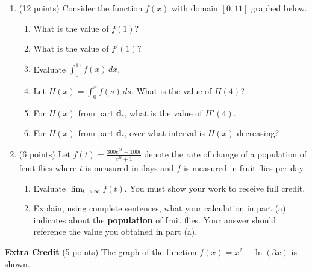 \documentclass[12pt]{article}
\let\ds\displaystyle
\begin{document}
\begin{enumerate}
\newpage
\item (12 points) Consider the function $f(x)$ with domain $[0,11]$ graphed below. 

\begin{center}
\end{center}

\bigskip
\begin{enumerate}
\item What is the value of $f(1)$?

\vfill

\item  What is the value of $f'(1)$?

\vfill

\item  Evaluate $\ds \int_{0}^{11} f(x)\,dx$.

\vfill

\item Let $H(x) =\ds \int_0^x f(s)\,ds$.  What is the value of $H(4)$?

\vfill

\item  For $H(x)$ from part \textbf{d.}, what is the value of $H'(4)$.

\vfill

\item For $H(x)$ from part \textbf{d.}, over what interval is $H(x)$ decreasing?
\vfill
\end{enumerate}

\newpage
\item (6 points) Let $\displaystyle f(t)= \frac{300e^{2t}+100t}{e^{3t} +1}$ denote the rate of change of a population of fruit flies where $t$ is measured in days and $f$ is measured in fruit flies per day.\\
\begin{enumerate}
\item Evaluate $\displaystyle \lim_{t \to \infty} f(t).$ You must show your work to receive full credit.
\vfill
\item Explain, using complete sentences, what your calculation in part (a) indicates about the \textbf{population} of fruit flies. Your answer should reference the value you obtained in part (a).
\vfill
\end{enumerate}
\end{enumerate}
\newpage
\textbf{Extra Credit} (5 points) The graph of the function $f(x)=x^2-\ln(3x)$ is shown.
\end{document}
